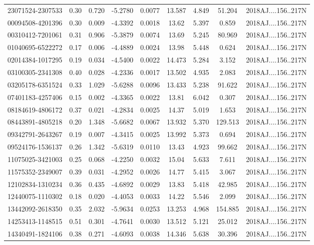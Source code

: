 \begin{tabular}{lcccccccc}
23071524-2307533 & 0.30 & 0.720 & -5.2780 & 0.0077 & 13.587 & 4.849 & 51.204 & 2018AJ....156..217N  \\
00094508-4201396 & 0.30 & 0.009 & -4.3392 & 0.0018 & 13.62 & 5.397 & 0.859 & 2018AJ....156..217N  \\
00310412-7201061 & 0.31 & 0.906 & -5.3879 & 0.0074 & 13.69 & 5.245 & 80.969 & 2018AJ....156..217N  \\
01040695-6522272 & 0.17 & 0.006 & -4.4889 & 0.0024 & 13.98 & 5.448 & 0.624 & 2018AJ....156..217N  \\
02014384-1017295 & 0.19 & 0.034 & -4.5400 & 0.0022 & 14.473 & 5.284 & 3.152 & 2018AJ....156..217N  \\
03100305-2341308 & 0.40 & 0.028 & -4.2336 & 0.0017 & 13.502 & 4.935 & 2.083 & 2018AJ....156..217N  \\
03205178-6351524 & 0.33 & 1.029 & -5.6288 & 0.0096 & 13.433 & 5.238 & 91.622 & 2018AJ....156..217N  \\
07401183-4257406 & 0.15 & 0.002 & -4.3365 & 0.0022 & 13.81 & 6.042 & 0.307 & 2018AJ....156..217N  \\
08184619-4806172 & 0.37 & 0.021 & -4.2834 & 0.0025 & 14.37 & 5.019 & 1.653 & 2018AJ....156..217N  \\
08443891-4805218 & 0.20 & 1.348 & -5.6682 & 0.0067 & 13.932 & 5.370 & 129.513 & 2018AJ....156..217N  \\
09342791-2643267 & 0.19 & 0.007 & -4.3415 & 0.0025 & 13.992 & 5.373 & 0.694 & 2018AJ....156..217N  \\
09524176-1536137 & 0.26 & 1.342 & -5.6319 & 0.0110 & 13.43 & 4.923 & 99.662 & 2018AJ....156..217N  \\
11075025-3421003 & 0.25 & 0.068 & -4.2250 & 0.0032 & 15.04 & 5.633 & 7.611 & 2018AJ....156..217N  \\
11575352-2349007 & 0.39 & 0.031 & -4.2952 & 0.0026 & 14.77 & 5.415 & 3.067 & 2018AJ....156..217N  \\
12102834-1310234 & 0.36 & 0.435 & -4.6892 & 0.0029 & 13.83 & 5.418 & 42.985 & 2018AJ....156..217N  \\
12440075-1110302 & 0.18 & 0.020 & -4.4053 & 0.0033 & 14.22 & 5.546 & 2.099 & 2018AJ....156..217N  \\
13442092-2618350 & 0.35 & 2.032 & -5.9634 & 0.0253 & 13.253 & 4.968 & 154.885 & 2018AJ....156..217N  \\
14253413-1148515 & 0.51 & 0.301 & -4.7641 & 0.0030 & 13.512 & 5.121 & 25.012 & 2018AJ....156..217N  \\
14340491-1824106 & 0.38 & 0.271 & -4.6093 & 0.0038 & 14.346 & 5.638 & 30.396 & 2018AJ....156..217N  \\

\end{tabular}
